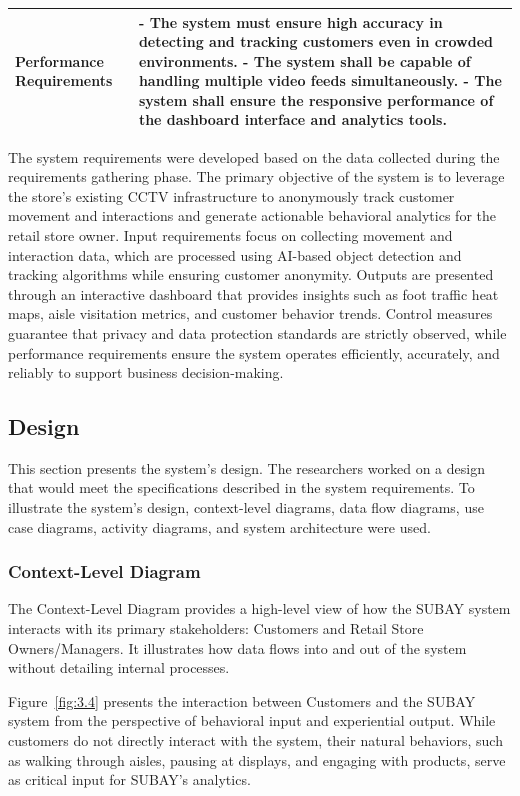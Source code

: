 {{\begin{longtable}{|p{4cm}|p{11cm}|}
		Performance Requirements & 
		- The system must ensure high accuracy in detecting and tracking customers even in crowded environments. \newline
		- The system shall be capable of handling multiple video feeds simultaneously. \newline
		- The system shall ensure the responsive performance of the dashboard interface and analytics tools. \\
		\hline
		
\end{longtable}
}

The system requirements were developed based on the data collected during the requirements gathering phase. The primary objective of the system is to leverage the store’s existing CCTV infrastructure to anonymously track customer movement and interactions and generate actionable behavioral analytics for the retail store owner. Input requirements focus on collecting movement and interaction data, which are processed using AI-based object detection and tracking algorithms while ensuring customer anonymity. Outputs are presented through an interactive dashboard that provides insights such as foot traffic heat maps, aisle visitation metrics, and customer behavior trends. Control measures guarantee that privacy and data protection standards are strictly observed, while performance requirements ensure the system operates efficiently, accurately, and reliably to support business decision-making.

\subsection{Design}
This section presents the system's design. The researchers worked on a design that would meet the specifications described in the system requirements. To illustrate the system's design, context-level diagrams, data flow diagrams, use case diagrams, activity diagrams, and system architecture were used.

\subsubsection{Context-Level Diagram}
The Context-Level Diagram provides a high-level view of how the SUBAY system interacts with its primary stakeholders: Customers and Retail Store Owners/Managers. It illustrates how data flows into and out of the system without detailing internal processes.

Figure~\ref{fig:3.4} presents the interaction between Customers and the SUBAY system from the perspective of behavioral input and experiential output. While customers do not directly interact with the system, their natural behaviors, such as walking through aisles, pausing at displays, and engaging with products, serve as critical input for SUBAY’s analytics. 

}
